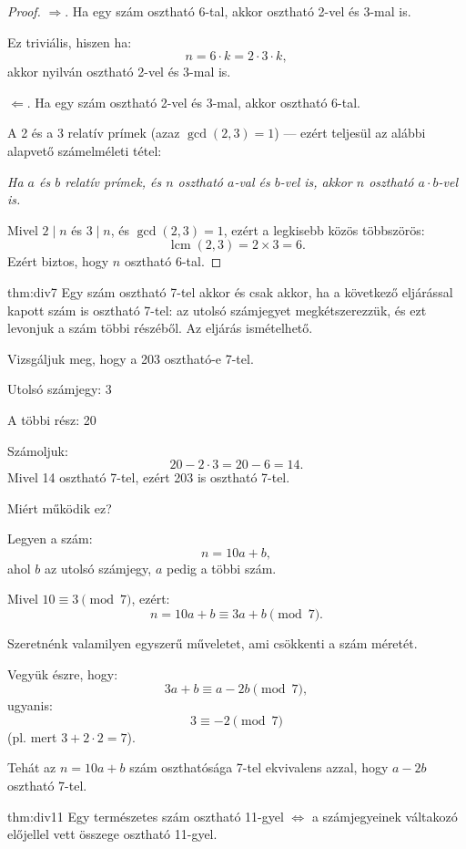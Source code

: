 \begin{proof}
$\Longrightarrow.$ Ha egy szám osztható 6-tal, akkor osztható 2-vel
és 3-mal is.

Ez triviális, hiszen ha: 
\[
n=6\cdot k=2\cdot3\cdot k,
\]
akkor nyilván osztható 2-vel és 3-mal is.

$\Longleftarrow.$ Ha egy szám osztható 2-vel és 3-mal, akkor osztható
6-tal.

A 2 és a 3 relatív prímek (azaz $\gcd(2,3)=1$) --- ezért teljesül
az alábbi alapvető számelméleti tétel:

\textit{Ha $a$ és $b$ relatív prímek, és $n$ osztható $a$-val
és $b$-vel is, akkor $n$ osztható $a\cdot b$-vel is.}

Mivel $2\mid n$ és $3\mid n$, és $\gcd(2,3)=1$, ezért a legkisebb
közös többszörös: 
\[
\operatorname{lcm}(2,3)=2\times3=6.
\]
Ezért biztos, hogy $n$ osztható 6-tal.
\end{proof}
\begin{theorem}{thm:div7}
Egy szám osztható 7-tel akkor és csak akkor, ha a következő eljárással
kapott szám is osztható 7-tel: az utolsó számjegyet megkétszerezzük,
és ezt levonjuk a szám többi részéből. Az eljárás ismételhető.
\end{theorem}

\begin{example}
Vizsgáljuk meg, hogy a 203 osztható-e 7-tel.

Utolsó számjegy: 3

A többi rész: 20

Számoljuk: 
\[
20-2\cdot3=20-6=14.
\]
Mivel 14 osztható 7-tel, ezért 203 is osztható 7-tel.

Miért működik ez?

Legyen a szám: 
\[
n=10a+b,
\]
ahol $b$ az utolsó számjegy, $a$ pedig a többi szám.

Mivel $10\equiv3\pmod 7$, ezért: 
\[
n=10a+b\equiv3a+b\pmod 7.
\]

Szeretnénk valamilyen egyszerű műveletet, ami csökkenti a szám méretét.

Vegyük észre, hogy: 
\[
3a+b\equiv a-2b\pmod 7,
\]
ugyanis: 
\[
3\equiv-2\pmod 7
\]
(pl. mert $3+2\cdot2=7$).

Tehát az $n=10a+b$ szám oszthatósága 7-tel ekvivalens azzal, hogy
$a-2b$ osztható 7-tel.
\end{example}

\begin{theorem}{thm:div11}
Egy természetes szám osztható 11-gyel $\iff$ a számjegyeinek váltakozó
előjellel vett összege osztható 11-gyel.
\end{theorem}

